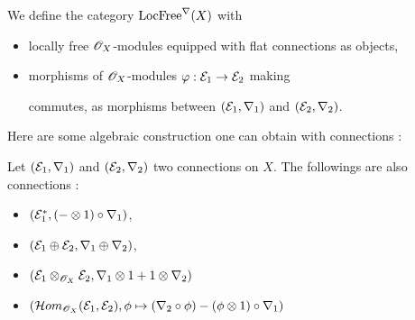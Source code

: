 \begin{mydef}
We define the category $\text{LocFree}^\nabla(X)$ with 
\begin{itemize}
\item locally free $\mathscr{O}_X$-modules equipped with flat connections as objects,
\item morphisms of $\mathscr{O}_X$-modules $\varphi : \mathcal{E}_1 \to \mathcal{E}_2$ making 
\begin{center}
\end{center}
commutes, as morphisms between $(\mathcal{E}_1,\nabla_1)$ and $(\mathcal{E}_2,\nabla_2)$.
\end{itemize}
\end{mydef}

Here are some algebraic construction one can obtain with connections :

\begin{myprop} \label{algebraic_construction_connection}
Let $(\mathcal{E}_1,\nabla_1)$ and $(\mathcal{E}_2,\nabla_2)$ two connections on $X$. The followings are also connections :
\begin{itemize}
\item[1)] $(\mathcal{E}_1^*,(\-- \otimes 1)\circ \nabla_1)$, 
\item[2)] $(\mathcal{E}_1 \oplus \mathcal{E}_2, \nabla_1 \oplus \nabla_2)$,
\item[3)] $(\mathcal{E}_1 \otimes_{\mathscr{O}_X} \mathcal{E}_2, \nabla_1 \otimes 1 + 1 \otimes \nabla_2)$
\item[4)] $(\mathcal{H}om_{\mathscr{O}_X}(\mathcal{E}_1,\mathcal{E}_2),\phi \mapsto (\nabla_2 \circ \phi) - (\phi \otimes 1) \circ \nabla_1)$
\end{itemize}
\end{myprop}

